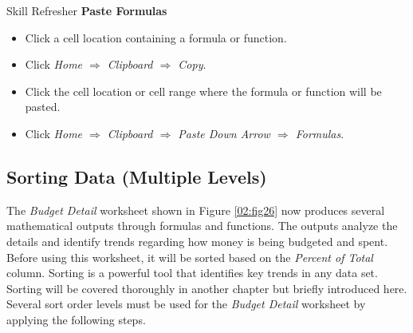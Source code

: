 \begin{center}
	\begin{sklbox}{Skill Refresher}
		\textbf{Paste Formulas}
		\\
		\begin{itemize}
			\setlength{\itemsep}{0pt}
			\setlength{\parskip}{0pt}
			\setlength{\parsep}{0pt}
			
			\item Click a cell location containing a formula or function.
			\item Click \textit{Home $ \Rightarrow $ Clipboard $ \Rightarrow $ Copy}.
			\item Click the cell location or cell range where the formula or function will be pasted.
			\item Click \textit{Home $ \Rightarrow $ Clipboard $ \Rightarrow $ Paste Down Arrow $ \Rightarrow $ Formulas}.
			
		\end{itemize}
	\end{sklbox}
\end{center}

\subsection{Sorting Data (Multiple Levels)}

The \textit{Budget Detail} worksheet shown in Figure \ref{02:fig26} now produces several mathematical outputs through formulas and functions. The outputs analyze the details and identify trends regarding how money is being budgeted and spent. Before using this worksheet, it will be sorted based on the \textit{Percent of Total} column. Sorting is a powerful tool that identifies key trends in any data set. Sorting will be covered thoroughly in another chapter but briefly introduced here. Several sort order levels must be used for the \textit{Budget Detail} worksheet by applying the following steps.

